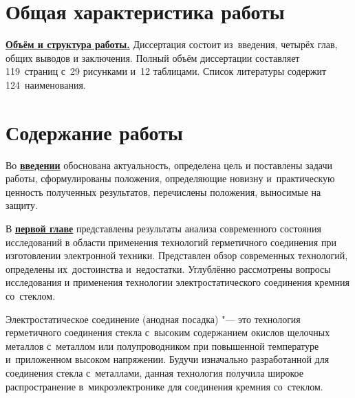 \section{Общая характеристика работы}

\newcommand{\actuality}{\underline{\textbf{\actualityTXT}}} %
\newcommand{\progress}{\underline{\textbf{\progressTXT}}}
\newcommand{\aim}{\underline{\textbf{\aimTXT}}}
\newcommand{\tasks}{\underline{\textbf{\tasksTXT}}}
\newcommand{\novelty}{\underline{\textbf{\noveltyTXT}}}
\newcommand{\influence}{\underline{\textbf{\influenceTXT}}}
\newcommand{\methods}{\underline{\textbf{\methodsTXT}}}
\newcommand{\defpositions}{\underline{\textbf{\defpositionsTXT}}}
\newcommand{\reliability}{\underline{\textbf{\reliabilityTXT}}}
\newcommand{\probation}{\underline{\textbf{\probationTXT}}}
\newcommand{\contribution}{\underline{\textbf{\contributionTXT}}}
\newcommand{\publications}{\underline{\textbf{\publicationsTXT}}}
\newcommand{\realisation}{\underline{\textbf{\realisationTXT}}}


\underline{\textbf{Объём и структура работы.}} Диссертация состоит из~введения,
четырёх глав, общих выводов и заключения.
Полный объём диссертации составляет
119~страниц с~29 рисунками и~12 таблицами.
Список литературы содержит
124~наименования.

\section{Содержание работы}
Во \underline{\textbf{введении}} обоснована актуальность, определена
цель и поставлены задачи работы, сформулированы положения,
определяющие новизну и~практическую ценность полученных результатов,
перечислены положения, выносимые на защиту.

В \underline{\textbf{первой главе}} представлены результаты анализа современного
состояния исследований в области применения технологий
герметичного соединения при изготовлении электронной техники.
Представлен обзор современных технологий, определены их~достоинства
и~недостатки.
Углублённо рассмотрены вопросы исследования и применения технологии
электростатического соединения кремния со~стеклом.

Электростатическое соединение
(анодная посадка)
"--- это технология герметичного
соединения стекла с~высоким содержанием окислов щелочных металлов
с~металлом или полупроводником при повышенной температуре
и~приложенном высоком напряжении. Будучи изначально разработанной для
соединения стекла с~металлами, данная
технология получила широкое распространение в~микроэлектронике для
соединения кремния
со~стеклом.

